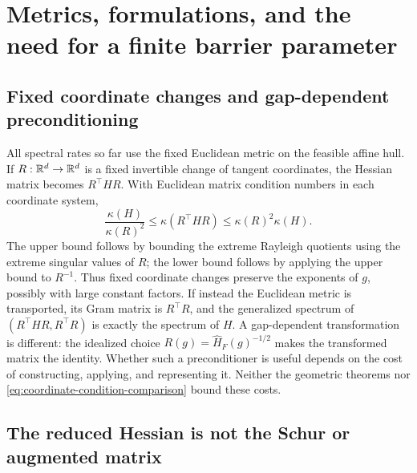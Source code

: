 \section{Metrics, formulations, and the need for a finite barrier parameter}
\label{sec:formulation-scope}

\subsection{Fixed coordinate changes and gap-dependent preconditioning}

All spectral rates so far use the fixed Euclidean metric on the
feasible affine hull. If $R:\mathbb R^d\to\mathbb R^d$ is a fixed invertible
change of tangent coordinates, the Hessian matrix becomes $R^\top HR$.
With Euclidean matrix condition numbers in each coordinate system,
\begin{equation}
 \frac{\kappa(H)}{\kappa(R)^2}
 \leq\kappa(R^\top HR)\leq\kappa(R)^2\kappa(H).
 \label{eq:coordinate-condition-comparison}
\end{equation}
The upper bound follows by bounding the extreme Rayleigh quotients
using the extreme singular values of $R$; the lower bound follows by
applying the upper bound to $R^{-1}$. Thus fixed coordinate changes preserve the exponents of $g$,
possibly with large constant factors. If instead the Euclidean metric
is transported, its Gram matrix is
$R^\top R$, and the generalized spectrum of $(R^\top HR,R^\top R)$ is
exactly the spectrum of $H$.
A gap-dependent transformation is different: the idealized choice
$R(g)=\widehat H_F(g)^{-1/2}$ makes the transformed matrix the
identity. Whether such a preconditioner is useful depends on the
cost of constructing, applying, and representing it. Neither the geometric theorems nor
\eqref{eq:coordinate-condition-comparison} bound these costs.

\subsection{The reduced Hessian is not the Schur or augmented matrix}

